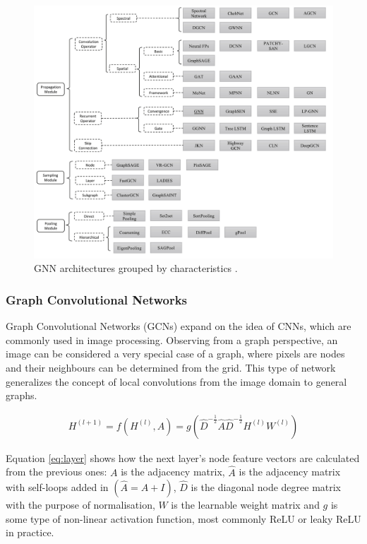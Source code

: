 	 \begin{figure}[!h]
	 	\centering
	 	\includegraphics[width=\textwidth]{figures/gnn_types.jpg}
	 	\caption{GNN architectures grouped by characteristics \cite{gnn_review}.}
	 \end{figure}
	
	\subsubsection{Graph Convolutional Networks}
	
	Graph Convolutional Networks \cite{kipf2016semi} (GCNs) expand on the idea of CNNs, which are commonly used in image processing. Observing from a graph perspective, an image can be considered a very special case of a graph, where pixels are nodes and their neighbours can be determined from the grid. This type of network generalizes the concept of local convolutions from the image domain to general graphs.
	
	\begin{align}
		H^{(l+1)} = f\left(H^{(l)}, A\right) = g\left(\hat{D}^{- \frac{1}{2}} \hat{A} \hat{D}^{- \frac{1}{2}} H^{(l)} W^{(l)}\right)
		\label{eq:layer}
	\end{align}
	
	Equation \ref{eq:layer} shows how the next layer's node feature vectors are calculated from the previous ones: $A$ is the adjacency matrix, $\hat{A}$ is the adjacency matrix with self-loops added in $(\hat{A} = A + I)$, $\hat{D}$ is the diagonal node degree matrix with the purpose of normalisation, $W$ is the learnable weight matrix and $g$ is some type of non-linear activation function, most commonly ReLU or leaky ReLU in practice.
	

